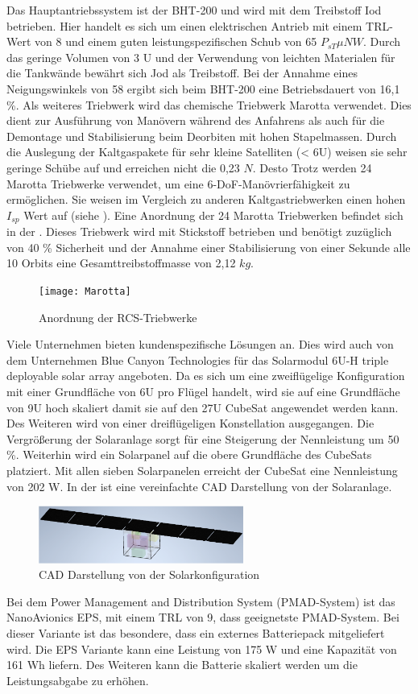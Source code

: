 Das Hauptantriebssystem ist der BHT-200 und wird mit dem Treibstoff Iod betrieben. Hier handelt es sich um einen elektrischen Antrieb mit einem TRL-Wert von 8 und einem guten leistungspezifischen Schub von 65 $P_{sT} {\mu N}{W}$. Durch das geringe Volumen von 3 U und der Verwendung von leichten Materialen für die Tankwände bewährt sich Jod als Treibstoff. Bei der Annahme eines Neigungswinkels von 58 \textdegree ergibt sich beim BHT-200 eine Betriebsdauert von 16,1 \%. Als weiteres Triebwerk wird das chemische Triebwerk Marotta verwendet. Dies dient zur Ausführung von Manövern während des Anfahrens als auch für die Demontage und Stabilisierung beim Deorbiten mit hohen Stapelmassen. Durch die Auslegung der Kaltgaspakete für sehr kleine Satelliten (< 6U) weisen sie sehr geringe Schübe auf und erreichen nicht die 0,23 $N$. Desto Trotz werden 24 Marotta Triebwerke verwendet, um eine 6-DoF-Manövrierfähigkeit zu ermöglichen. Sie weisen im Vergleich zu anderen Kaltgastriebwerken einen hohen $I_{sp}$ Wert auf (siehe ). Eine Anordnung der 24 Marotta Triebwerken befindet sich in der . Dieses Triebwerk wird mit Stickstoff betrieben und benötigt zuzüglich von 40 \% Sicherheit und der Annahme einer Stabilisierung von einer Sekunde alle 10 Orbits  eine Gesamttreibstoffmasse von 2,12 $kg$.
\begin{figure}[!h]
\centering
	\texttt{[image: Marotta]}
	\caption{Anordnung der RCS-Triebwerke \cite{Lettau.}}
	\label{fig:marotta}
\end{figure}
Viele Unternehmen bieten kundenspezifische Lösungen an. Dies wird auch von dem Unternehmen Blue Canyon Technologies für das Solarmodul 6U-H triple deployable solar array angeboten. Da es sich um eine zweiflügelige Konfiguration mit einer Grundfläche von 6U pro Flügel handelt, wird sie auf eine Grundfläche von 9U hoch skaliert damit sie auf  den 27U CubeSat angewendet werden kann. Des Weiteren wird von einer dreiflügeligen Konstellation ausgegangen. Die Vergrößerung der Solaranlage sorgt für eine Steigerung der Nennleistung um 50 \%. Weiterhin wird ein Solarpanel auf die obere Grundfläche des CubeSats platziert. Mit allen sieben Solarpanelen erreicht der CubeSat eine Nennleistung von 202 W. In der  ist eine vereinfachte CAD Darstellung von der Solaranlage. 
\begin{figure}[!h]
\centering
	\includegraphics[width=0.60\textwidth]{graphics/Solarpanel.PNG}
	\caption{CAD Darstellung von der Solarkonfiguration \cite{Lettau.}}
	\label{fig:solarpanel}
\end{figure}
Bei dem Power Management and Distribution System (PMAD-System) ist das NanoAvionics EPS, mit einem TRL von 9, dass geeignetste PMAD-System. Bei dieser Variante ist das besondere, dass ein externes Batteriepack mitgeliefert wird. Die EPS Variante kann eine Leistung von 175 W und eine Kapazität von 161 Wh liefern. Des Weiteren kann die Batterie skaliert werden um die Leistungsabgabe zu erhöhen.

